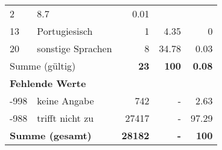 \begin{longtable}{lXrrr}
       \num{2} &
       \num[round-mode=places,round-precision=2]{8,7} &
         \num[round-mode=places,round-precision=2]{0,01} \\

     13 &
     \multicolumn{1}{X}{ Portugiesisch   } &


       \num{1} &
       \num[round-mode=places,round-precision=2]{4,35} &
         \num[round-mode=places,round-precision=2]{0} \\

     20 &
     \multicolumn{1}{X}{ sonstige Sprachen   } &


       \num{8} &
       \num[round-mode=places,round-precision=2]{34,78} &
         \num[round-mode=places,round-precision=2]{0,03} \\
     \midrule
     \multicolumn{2}{l}{Summe (gültig)} &
       \textbf{\num{23}} &
     \textbf{100} &
       \textbf{\num[round-mode=places,round-precision=2]{0,08}} \\
     \multicolumn{5}{l}{\textbf{Fehlende Werte}}\\
       -998 &
       keine Angabe &
         \num{742} &
        - &
         \num[round-mode=places,round-precision=2]{2,63} \\
       -988 &
       trifft nicht zu &
         \num{27417} &
        - &
         \num[round-mode=places,round-precision=2]{97,29} \\
     \midrule
     \multicolumn{2}{l}{\textbf{Summe (gesamt)}} &
          \textbf{\num{28182}} &
        \textbf{-} &
        \textbf{100} \\
     \bottomrule
     \end{longtable}
     
